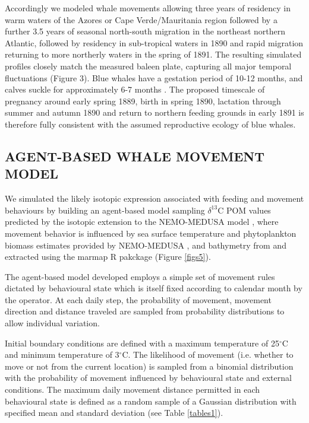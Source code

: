 \documentclass[a4paper,10pt]{article}
\begin{document}
Accordingly we modeled whale movements allowing three years of residency in warm waters of the Azores or Cape Verde/Mauritania region followed by a further 3.5 years of seasonal north-south migration in the northeast northern Atlantic, followed by residency in sub-tropical waters in 1890 and rapid migration returning to more northerly waters in the spring of 1891. 
The resulting simulated profiles closely match the measured baleen plate, capturing all major temporal fluctuations (Figure 3). 
Blue whales have a gestation period of 10-12 months, and calves suckle for approximately 6-7 months \citep{handbook}. 
The proposed timescale of pregnancy around early spring 1889, birth in spring 1890, lactation through summer and autumn 1890 and return to northern feeding grounds in early 1891 is therefore fully consistent with the assumed reproductive ecology of blue whales.

\subsection*{AGENT-BASED WHALE MOVEMENT MODEL}
We simulated the likely isotopic expression associated with feeding and movement behaviours by building an agent-based model sampling $\delta^{13}$C POM values predicted by the isotopic extension to the NEMO-MEDUSA model \citep{magozzi2017using,yool2013medusa}, where movement behavior is influenced by sea surface temperature and phytoplankton biomass estimates provided by NEMO-MEDUSA \citep{yool2013medusa}, and bathymetry from \cite{bathy} and extracted using the marmap R pakckage \citep{marmap} (Figure \ref{figs5}).
 
The agent-based model developed employs a simple set of movement rules dictated by behavioural state which is itself fixed according to calendar month by the operator. 
At each daily step, the probability of movement, movement direction and distance traveled are sampled from probability distributions to allow individual variation.

Initial boundary conditions are defined with a maximum temperature of 25$^{\circ}$C and minimum temperature of 3$^{\circ}$C. 
The likelihood of movement (i.e. whether to move or not from the current location) is sampled from a binomial distribution with the probability of movement influenced by behavioural state and external conditions. 
The maximum daily movement distance permitted in each behavioural state is defined as a random sample of a Gaussian distribution with specified mean and standard deviation (see Table \ref{tables1}).
 
\end{document}
